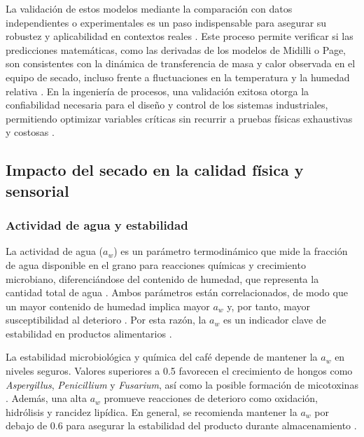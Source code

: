 La validación de estos modelos mediante la comparación con datos independientes o experimentales es un paso indispensable para asegurar su robustez y aplicabilidad en contextos reales \parencite{amaral_simulation_2018, fauzi_experimental_2025, meng_study_2023}. Este proceso permite verificar si las predicciones matemáticas, como las derivadas de los modelos de Midilli o Page, son consistentes con la dinámica de transferencia de masa y calor observada en el equipo de secado, incluso frente a fluctuaciones en la temperatura y la humedad relativa \parencite{amaral_simulation_2018, p_romero_leiton_mathematical_2025, phitakwinai_thinlayer_2019}. En la ingeniería de procesos, una validación exitosa otorga la confiabilidad necesaria para el diseño y control de los sistemas industriales, permitiendo optimizar variables críticas sin recurrir a pruebas físicas exhaustivas y costosas \parencite{fauzi_experimental_2025, leonardo_barcelos_mateus_modeling_2021}. 


\subsection{Impacto del secado en la calidad física y sensorial}

\subsubsection{Actividad de agua y estabilidad}

La actividad de agua ($a_w$) es un parámetro termodinámico que mide la fracción de agua disponible en el grano para reacciones químicas y crecimiento microbiano, diferenciándose del contenido de humedad, que representa la cantidad total de agua \parencite{abreu_influence_2025, penuela_martinez_influence_2023}. Ambos parámetros están correlacionados, de modo que un mayor contenido de humedad implica mayor $a_w$ y, por tanto, mayor susceptibilidad al deterioro \parencite{abreu_influence_2025}. Por esta razón, la $a_w$ es un indicador clave de estabilidad en productos alimentarios \parencite{largoavila_changes_2023}.

La estabilidad microbiológica y química del café depende de mantener la $a_w$ en niveles seguros. Valores superiores a 0.5 favorecen el crecimiento de hongos como \textit{Aspergillus}, \textit{Penicillium} y \textit{Fusarium}, así como la posible formación de micotoxinas \parencite{abreu_influence_2025}. Además, una alta $a_w$ promueve reacciones de deterioro como oxidación, hidrólisis y rancidez lipídica. En general, se recomienda mantener la $a_w$ por debajo de 0.6 para asegurar la estabilidad del producto durante almacenamiento \parencite{penuela_martinez_influence_2023}.


